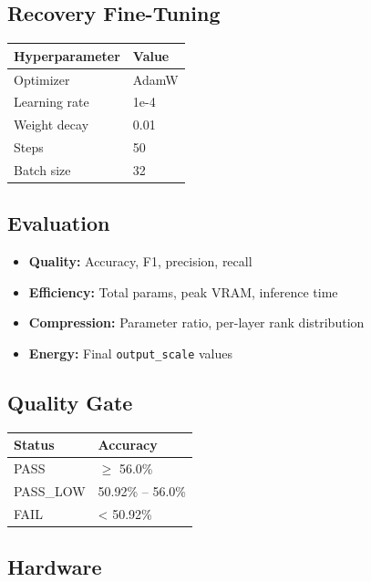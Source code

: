 \subsection{Recovery Fine-Tuning}

\begin{table}[H]
\centering
\small
\begin{tabular}{ll}
\toprule
\textbf{Hyperparameter} & \textbf{Value} \\
\midrule
Optimizer & AdamW \\
Learning rate & 1e-4 \\
Weight decay & 0.01 \\
Steps & 50 \\
Batch size & 32 \\
\bottomrule
\end{tabular}
\end{table}

\subsection{Evaluation}

\begin{itemize}
\item \textbf{Quality:} Accuracy, F1, precision, recall
\item \textbf{Efficiency:} Total params, peak VRAM, inference time
\item \textbf{Compression:} Parameter ratio, per-layer rank distribution
\item \textbf{Energy:} Final \texttt{output\_scale} values

\end{itemize}
\subsection{Quality Gate}

\begin{table}[H]
\centering
\small
\begin{tabular}{ll}
\toprule
\textbf{Status} & \textbf{Accuracy} \\
\midrule
PASS & $\ge$ 56.0\% \\
PASS\_LOW & 50.92\% -- 56.0\% \\
FAIL & < 50.92\% \\
\bottomrule
\end{tabular}
\end{table}

\subsection{Hardware}

